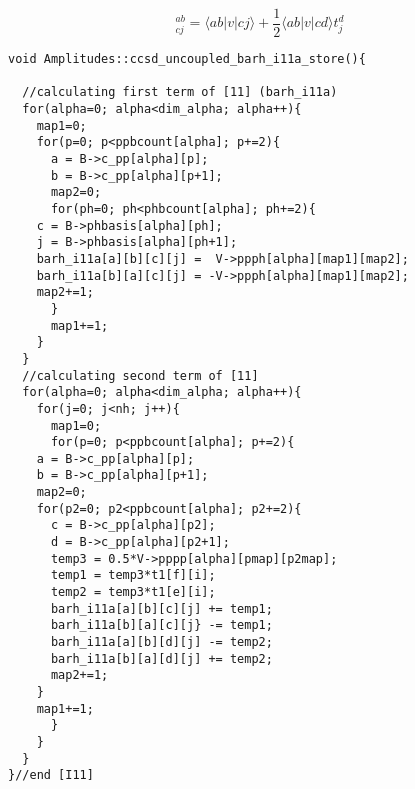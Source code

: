 \begin{equation*}
[I11]_{cj}^{ab} = \langle ab|v|cj\rangle +\frac{1}{2}\langle ab|v|cd\rangle t_j^d 
\end{equation*}
\begin{lstlisting}[label={list:impl:intermediate11},caption={implementation of I11 in the amp1 class function ccsd\_uncoupled\_barh\_i11a\_store}]
void Amplitudes::ccsd_uncoupled_barh_i11a_store(){
   
  //calculating first term of [11] (barh_i11a)
  for(alpha=0; alpha<dim_alpha; alpha++){
    map1=0;
    for(p=0; p<ppbcount[alpha]; p+=2){
      a = B->c_pp[alpha][p];
      b = B->c_pp[alpha][p+1];
      map2=0;
      for(ph=0; ph<phbcount[alpha]; ph+=2){
	c = B->phbasis[alpha][ph];
	j = B->phbasis[alpha][ph+1];
	barh_i11a[a][b][c][j] =  V->ppph[alpha][map1][map2];
	barh_i11a[b][a][c][j] = -V->ppph[alpha][map1][map2];
	map2+=1;
      }
      map1+=1;
    }
  }
  //calculating second term of [11]
  for(alpha=0; alpha<dim_alpha; alpha++){
    for(j=0; j<nh; j++){
      map1=0;
      for(p=0; p<ppbcount[alpha]; p+=2){
	a = B->c_pp[alpha][p];
	b = B->c_pp[alpha][p+1];
	map2=0;
	for(p2=0; p2<ppbcount[alpha]; p2+=2){ 
	  c = B->c_pp[alpha][p2];
	  d = B->c_pp[alpha][p2+1];
	  temp3 = 0.5*V->pppp[alpha][pmap][p2map];
	  temp1 = temp3*t1[f][i];
	  temp2 = temp3*t1[e][i]; 
	  barh_i11a[a][b][c][j] += temp1;
	  barh_i11a[b][a][c][j} -= temp1;
	  barh_i11a[a][b][d][j] -= temp2;
	  barh_i11a[b][a][d][j] += temp2;
	  map2+=1;
	}
	map1+=1;
      }
    }
  }
}//end [I11]
\end{lstlisting}
